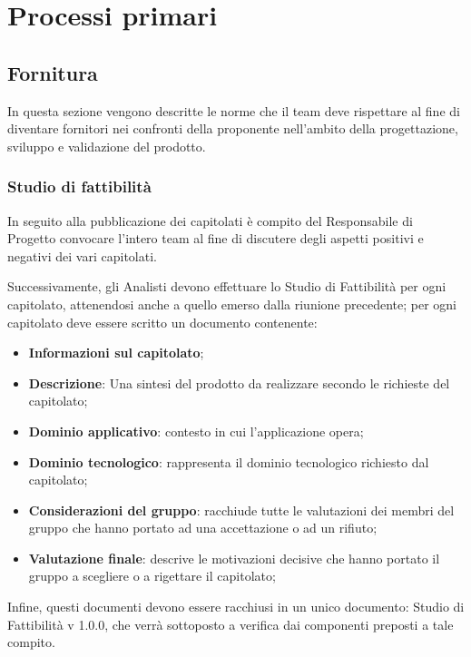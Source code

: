 \section{Processi primari}
\subsection{Fornitura}
In questa sezione vengono descritte le norme che il team deve rispettare al fine di diventare fornitori nei confronti della proponente nell'ambito della progettazione, sviluppo e validazione del prodotto.
\subsubsection{Studio di fattibilità}
In seguito alla pubblicazione dei capitolati è compito del Responsabile di Progetto convocare l'intero team al fine di discutere degli aspetti positivi e negativi dei vari capitolati.

Successivamente, gli Analisti devono effettuare lo Studio di Fattibilità per ogni capitolato, attenendosi anche a quello emerso dalla riunione precedente; per ogni capitolato deve essere scritto un documento contenente:
\begin{itemize}
\item \textbf{Informazioni sul capitolato};
\item \textbf{Descrizione}: Una sintesi del prodotto da realizzare secondo le richieste del capitolato;
\item \textbf{Dominio applicativo}: contesto in cui l'applicazione opera;
\item \textbf{Dominio tecnologico}: rappresenta il dominio tecnologico richiesto dal capitolato;
\item \textbf{Considerazioni del gruppo}: racchiude tutte le valutazioni dei membri del gruppo che hanno portato ad una accettazione o ad un rifiuto;
\item \textbf{Valutazione finale}: descrive le motivazioni decisive che hanno portato il gruppo a scegliere o a rigettare il capitolato;
\end{itemize}


Infine, questi documenti devono essere racchiusi in un unico documento: Studio di Fattibilità v 1.0.0, che verrà sottoposto a verifica dai componenti preposti a tale compito.

